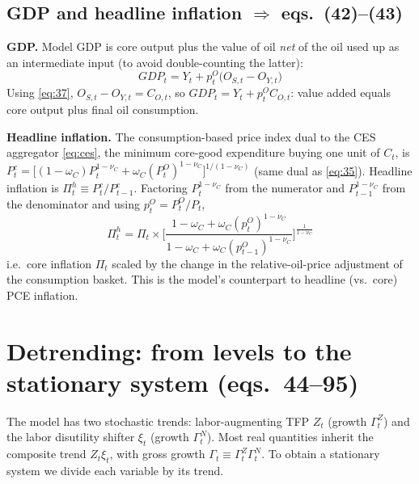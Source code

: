 \subsection{GDP and headline inflation \texorpdfstring{$\Rightarrow$}{=>} eqs.\ (42)--(43)}
\textbf{GDP.} Model GDP is core output plus the value of oil \emph{net} of the oil used up as an
intermediate input (to avoid double-counting the latter):
\begin{equation}\label{eq:42}
\boxed{\,GDP_t=Y_t+p^O_t\big(O_{S,t}-O_{Y,t}\big)\,}\tag{P-42}
\end{equation}
Using \eqref{eq:37}, $O_{S,t}-O_{Y,t}=C_{O,t}$, so $GDP_t=Y_t+p^O_tC_{O,t}$: value added equals core
output plus final oil consumption.

\medskip
\noindent\textbf{Headline inflation.} The consumption-based price index dual to the CES aggregator
\eqref{eq:ces}, the minimum core-good expenditure buying one unit of $C_t$, is
$P^c_t=\big[(1-\omega_C)P_t^{1-\nu_C}+\omega_C(P^O_t)^{1-\nu_C}\big]^{1/(1-\nu_C)}$ (same dual as
\eqref{eq:35}). Headline inflation is $\Pi^h_t\equiv P^c_t/P^c_{t-1}$. Factoring $P_t^{1-\nu_C}$ from
the numerator and $P_{t-1}^{1-\nu_C}$ from the denominator and using $p^O_t=P^O_t/P_t$,
\begin{equation}\label{eq:43}
\boxed{\,\Pi^h_t=\Pi_t\times\Big[\frac{1-\omega_C+\omega_C(p^O_t)^{1-\nu_C}}{1-\omega_C+\omega_C(p^O_{t-1})^{1-\nu_C}}\Big]^{\frac{1}{1-\nu_C}}\,}\tag{P-43}
\end{equation}
i.e.\ core inflation $\Pi_t$ scaled by the change in the relative-oil-price adjustment of the
consumption basket. This is the model's counterpart to headline (vs.\ core) PCE inflation.

\section{Detrending: from levels to the stationary system (eqs.\ 44--95)}\label{sec:detrend}

The model has two stochastic trends: labor-augmenting TFP $Z_t$ (growth $\Gamma^Z_t$) and the labor
disutility shifter $\xi_t$ (growth $\Gamma^N_t$). Most real quantities inherit the composite trend
$Z_t\xi_t$, with gross growth $\Gamma_t\equiv\Gamma^Z_t\Gamma^N_t$. To obtain a stationary system we
divide each variable by its trend.

